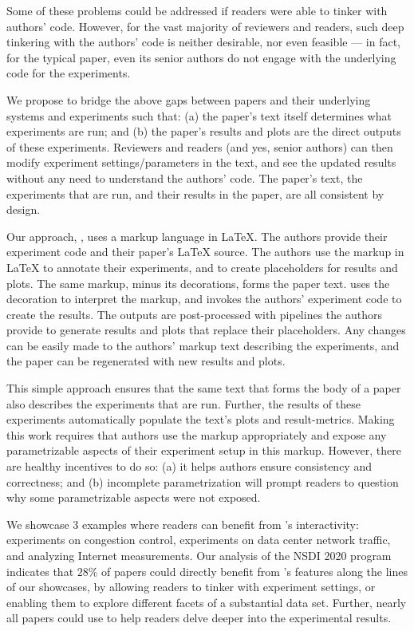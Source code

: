 Some of these problems could be addressed if readers were able to tinker with authors' code. However, for the vast majority of reviewers and readers, such deep tinkering with the authors' code is neither desirable, nor even feasible --- in fact, for the typical paper, even its senior authors do not engage with the underlying code for the experiments.

We propose to bridge the above gaps between papers and their underlying systems and experiments such that: (a) the paper's text itself determines what experiments are run; and (b) the paper's results and plots are the direct outputs of these experiments. 
Reviewers and readers (and yes, senior authors) can then modify experiment settings/parameters in the text, and see the updated results without any need to understand the authors' code. The paper's text, the experiments that are run, and their results in the paper, are all consistent by design.

Our approach, \sysname, uses a markup language in \LaTeX. The authors provide their experiment code and their paper's \LaTeX{} source. The authors use the markup in \LaTeX{} to annotate their experiments, and to create placeholders for results and plots. The same markup, minus its decorations, forms the paper text. \sysname uses the decoration to interpret the markup, and invokes the authors' experiment code to create the results. The outputs are post-processed with pipelines the authors provide to generate results and plots that replace their placeholders. 
Any changes can be easily made to the authors' markup text describing the experiments, and the paper can be regenerated with new results and plots.

This simple approach ensures that the same text that forms the body of a paper also describes the experiments that are run. Further, the results of these experiments automatically populate the text's plots and result-metrics. Making this work requires that authors use the markup appropriately and expose any parametrizable aspects of their experiment setup in this markup. However, there are healthy incentives to do so: (a) it helps authors ensure consistency and correctness; and (b) incomplete parametrization will prompt readers to question why some parametrizable aspects were not exposed.

We showcase 3 examples where readers can benefit from \sysname's interactivity: experiments on congestion control, experiments on data center network traffic, and analyzing Internet measurements. Our analysis of the NSDI 2020 program indicates that $28\%$ of papers could directly benefit from \sysname's features along the lines of our showcases, by allowing readers to tinker with experiment settings, or enabling them to explore different facets of a substantial data set. Further, nearly all papers could use \sysname to help readers delve deeper into the experimental results.


